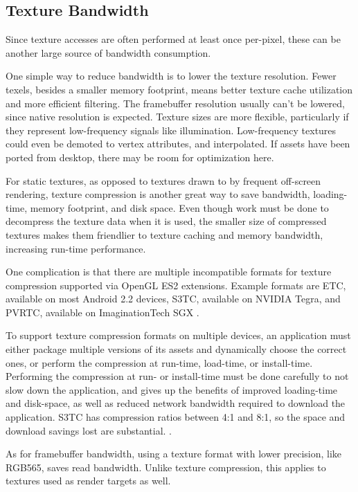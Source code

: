 \subsection{Texture Bandwidth}\label{JonMcCaffrey-Texture-Bandwidth} Since
texture accesses are often performed at least once per-pixel, these can be
another large source of bandwidth consumption.


One simple way to reduce bandwidth is to lower the texture resolution.  Fewer
texels, besides a smaller memory footprint, means better texture cache
utilization and more efficient filtering.  The framebuffer resolution usually
can't be lowered, since native resolution is expected.  Texture sizes are more
flexible, particularly if they represent low-frequency signals like
illumination.  Low-frequency textures could even be demoted to vertex
attributes, and interpolated.  If assets have been ported from desktop, there
may be room for optimization here.


For static textures, as opposed to textures drawn to by frequent off-screen
rendering, texture compression is another great way to save bandwidth,
loading-time, memory footprint, and disk space.  Even though work must be done
to decompress the texture data when it is used, the smaller size of compressed
textures makes them friendlier to texture caching and memory bandwidth,
increasing run-time performance. 

One complication is that there are multiple incompatible formats for texture
compression supported via OpenGL ES2
 extensions.  Example formats are ETC,
available on most Android 2.2 devices, S3TC, available on NVIDIA Tegra, and
PVRTC,
 available on ImaginationTech SGX \cite{Motorola11}.

To support texture compression formats on multiple devices, an
application must either package multiple versions of its assets and dynamically
choose the correct ones, or perform the compression at run-time, load-time, or
install-time.  Performing the compression at run- or install-time must be done
carefully to not slow down the application, and gives up the benefits of
improved loading-time and disk-space, as well as reduced network bandwidth
required to download the application.  S3TC has compression ratios between 4:1
and 8:1, so the space and download savings lost are substantial.
\cite{Domine00}.

As for framebuffer bandwidth, using a texture format with lower precision, like
RGB565, saves read bandwidth.  Unlike texture compression, this applies to
textures used as render targets as well.

